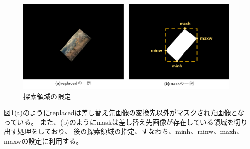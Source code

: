 \begin{figure}[h]
    \centering
    \includegraphics[width=1\linewidth]{fig/mask.png}
    \caption{探索領域の限定}
    \label{fig:mask}
\end{figure}

図\ref{fig:mask}(a)のようにreplacedは差し替え先画像の変換先以外がマスクされた画像となっている。
また、(b)のようにmaskは差し替え先画像が存在している領域を切り出す処理をしており、
後の探索領域の指定、すなわち、minh、minw、maxh、maxwの設定に利用する。

